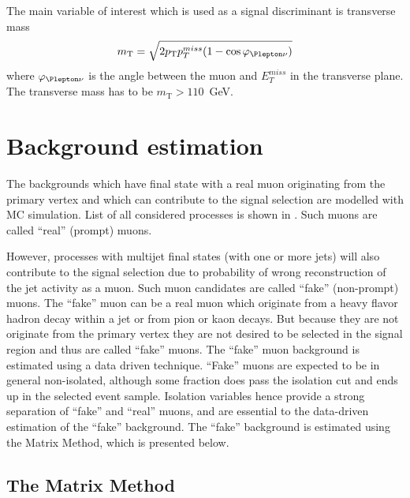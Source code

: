 
The main variable of interest which is used as a signal discriminant is transverse mass
\begin{equation}
 m_\mathrm{T} = \sqrt{2 p_\mathrm{T} p_T^{miss} (1-\cos\varphi_{\Plepton\nu})}
\end{equation}
where $\varphi_{\Plepton\nu}$ is the angle between the muon and $E_T^{miss}$ in the transverse plane.
The transverse mass has to be $m_\mathrm{T} > 110$~GeV.


\section{Background estimation}
\label{sec:wprime_backgroundEstimation}

The backgrounds which have final state with a real muon originating from the primary vertex and 
which can contribute to the signal selection are modelled with MC simulation.
List of all considered processes is shown in .
Such muons are called ``real'' (prompt) muons.

However, processes with multijet final states (with one or more jets) will also contribute to
the signal selection due to probability of wrong reconstruction of the jet activity as a muon.
Such muon candidates are called ``fake'' (non-prompt) muons.
The ``fake'' muon can be a real muon which originate from a heavy flavor hadron decay within a jet
or from pion or kaon decays. But because they are not originate from the primary vertex they are not
desired to be selected in the signal region and thus are called ``fake'' muons.
The ``fake'' muon background is estimated using a data driven technique. 
``Fake'' muons are expected to be in general non-isolated, although some
fraction does pass the isolation cut and ends up in the selected event sample. Isolation variables
hence provide a strong separation of ``fake'' and ``real'' muons, and are essential to the data-driven
estimation of the ``fake'' background.
The ``fake'' background is estimated using the Matrix Method, which is presented below.

\subsection{The Matrix Method}
\label{subsec:matrix_method}

